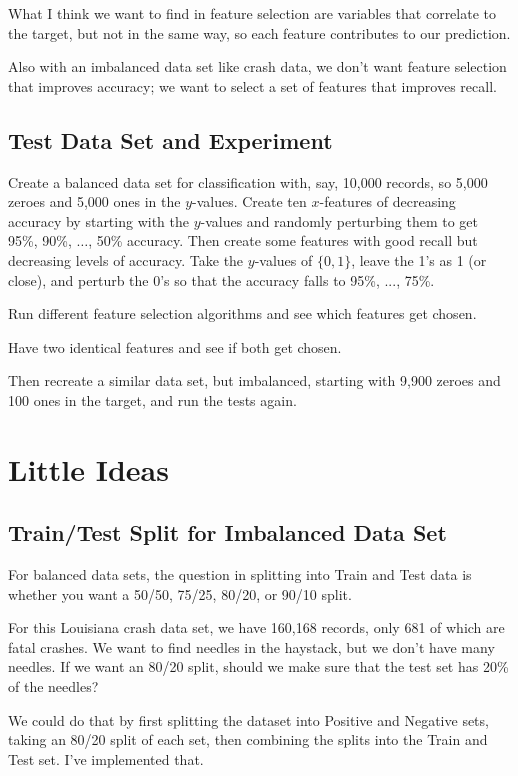 \documentclass[11pt]{article}
\begin{document}
\begin{spacing}{1.2}
What I think we want to find in feature selection are variables that correlate to the target, but not in the same way, so each feature contributes to our prediction.  

Also with an imbalanced data set like crash data, we don't want feature selection that improves accuracy; we want to select a set of features that improves recall.  

\subsection{Test Data Set and Experiment}

Create a balanced data set for classification with, say, 10,000 records, so 5,000 zeroes and 5,000 ones in the $y$-values.  Create ten $x$-features of decreasing accuracy by starting with the $y$-values and randomly perturbing them to get 95\%, 90\%, $\dots$, 50\% accuracy.  Then create some features with good recall but decreasing levels of accuracy.  Take the $y$-values of $\{0,1\}$, leave the 1's as 1 (or close), and perturb the 0's so that the accuracy falls to 95\%, ..., 75\%.    

Run different feature selection algorithms and see which features get chosen.  

Have two identical features and see if both get chosen.  

Then recreate a similar data set, but imbalanced, starting with 9,900 zeroes and 100 ones in the target, and run the tests again.

\section{Little Ideas}

\subsection{Train/Test Split for Imbalanced Data Set}

For balanced data sets, the question in splitting into Train and Test data is whether you want a 50/50, 75/25, 80/20, or 90/10 split.  

For this Louisiana crash data set, we have 160,168 records, only 681 of which are fatal crashes.  We want to find needles in the haystack, but we don't have many needles.  If we want an 80/20 split, should we make sure that the test set has 20\% of the needles?

We could do that by first splitting the dataset into Positive and Negative sets, taking an 80/20 split of each set, then combining the splits into the Train and Test set.  I've implemented that.  


\end{spacing}
\end{document}
